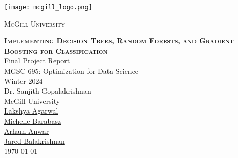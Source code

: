 \begin{titlepage}
    \begin{center}
    	\texttt{[image: mcgill\_logo.png]} \par
	\vspace{1cm}
	{\scshape\LARGE McGill University \par}
	\vspace{1.5cm}
    {\scshape\bfseries\fontsize{25}{30}\selectfont Implementing Decision Trees, Random Forests, and Gradient Boosting for Classification} 
    \\\vspace{20pt}
    {\LARGE Final Project Report}
    \\\vspace{20pt}
    {\LARGE MGSC 695: Optimization for Data Science}
    \\\vspace{15pt}
    {Winter 2024}
    \\\vspace{30pt}
    {Dr. Sanjith Gopalakrishnan} \\
    {McGill University}
    \\\vspace{20pt}
    {
    \href{mailto:lakshya.agarwal@mail.mcgill.ca}{Lakshya Agarwal} \\ \href{mailto:michelle.barabasz@mail.mcgill.ca}{Michelle Barabasz} \\ \href{mailto:arham.anwar@mail.mcgill.ca}{Arham Anwar} \\
    \href{mailto:vishak.balakrishnan@mail.mcgill.ca}{Jared Balakrishnan}
    }
    \vspace{25pt}
    \\ \today
    \end{center}
\end{titlepage}
